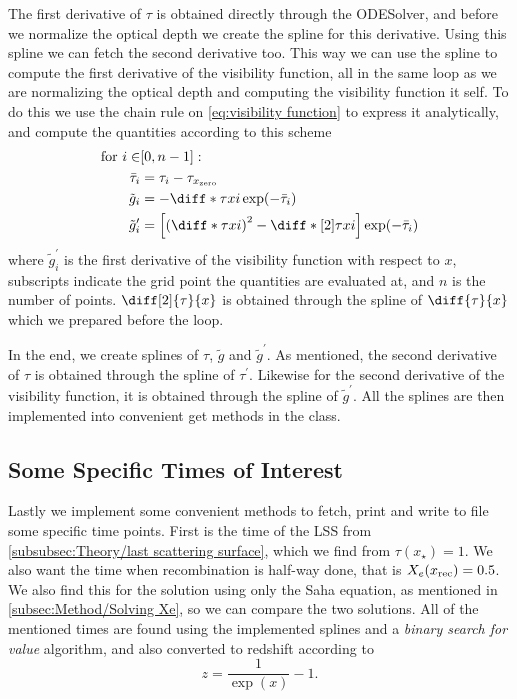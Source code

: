 \documentclass[10pt,a4paper]{article}
\begin{document}
The first derivative of $\tau$ is obtained directly through the ODESolver, and before we normalize the optical depth we create the spline for this derivative. Using this spline we can fetch the second derivative too. This way we can use the spline to compute the first derivative of the visibility function, all in the same loop as we are normalizing the optical depth and computing the visibility function it self. To do this we use the chain rule on \cref{eq:visibility function} to express it analytically, and compute the quantities according to this scheme
\begin{align*}
    \text{for } i \in &[0,n-1]:
    \\
    \bar{\tau}_i &= \tau_i - \tau_{x_{\rm{zero}}}
    \\
    \tilde{g}_i &= - \diff*{\tau}{x}{i}\exp(-\bar{\tau}_i)
    \\
    \tilde{g}_i^\prime &= \left[\left(\diff*{\tau}{x}{i}\right)^2-\diff*[2]{\tau}{x}{i}\right]\exp(-\bar{\tau}_i)
\end{align*}
where $\tilde{g}_i^\prime$ is the first derivative of the visibility function with respect to $x$, subscripts indicate the grid point the quantities are evaluated at, and $n$ is the number of points. $\diff[2]{\tau}{x}$ is obtained through the spline of $\diff{\tau}{x}$ which we prepared before the loop.

In the end, we create splines of $\tau$, $\tilde{g}$ and $\tilde{g}^\prime$. As mentioned, the second derivative of $\tau$ is obtained through the spline of $\tau^\prime$. Likewise for the second derivative of the visibility function, it is obtained through the spline of $\tilde{g}^\prime$. All the splines are then implemented into convenient get methods in the class.

\subsection{Some Specific Times of Interest}
\label{subsec:Method/Times of interest}
Lastly we implement some convenient methods to fetch, print and write to file some specific time points. First is the time of the LSS from \cref{subsubsec:Theory/last scattering surface}, which we find from $\tau(x_\star)=1$. We also want the time when recombination is half-way done, that is $X_e(x_{\rm{rec}}) = 0.5$. We also find this for the solution using only the Saha equation, as mentioned in \cref{subsec:Method/Solving Xe}, so we can compare the two solutions. All of the mentioned times are found using the implemented splines and a \textit{binary search for value} algorithm, and also converted to redshift according to
\begin{equation*}
    z = \frac{1}{\exp(x)}-1.
\end{equation*}
\end{document}
